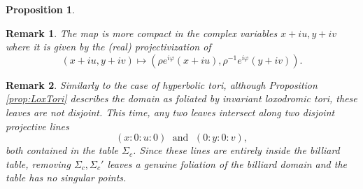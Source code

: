 \documentclass{article}
\newtheorem{prop}{Proposition}[section]
\newtheorem{rmk}{Remark}
\begin{document}
\begin{appendix}
\begin{prop}
\end{prop}

\begin{rmk}
    The map is more compact in the complex variables $x+iu, y+iv$ where it is given by the (real) projectivization of
    \[ (x+iu, y + iv)\mapsto (\rho e^{i\varphi}(x+iu),  \rho^{-1}e^{i\varphi}(y+iv)).\]
\end{rmk}


\begin{rmk}
    Similarly to the case of hyperbolic tori, although Proposition \ref{prop:LoxTori} describes the domain as foliated by invariant loxodromic tori, these leaves are not disjoint. This time, any two leaves intersect along two disjoint projective lines
    \[(x: 0: u :0)\; \text{ and }  \; (0: y: 0: v),\]
    both contained in the table $\Sigma_c$. Since these lines are entirely inside the billiard table, removing $\Sigma_c, \Sigma_c'$ leaves a genuine foliation of the billiard domain and the table has no singular points.
\end{rmk}



\end{appendix}
\end{document}
